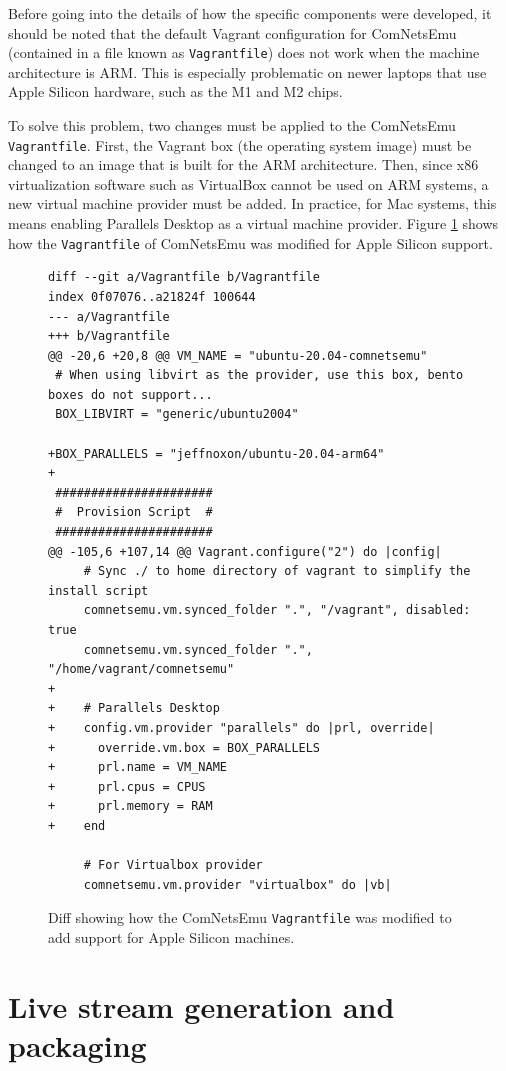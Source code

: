 Before going into the details of how the specific components were developed, it should be noted that the default Vagrant configuration for ComNetsEmu (contained in a file known as \texttt{Vagrantfile}) does not work when the machine architecture is ARM. This is especially problematic on newer laptops that use Apple Silicon hardware, such as the M1 and M2 chips.

To solve this problem, two changes must be applied to the ComNetsEmu \texttt{Vagrantfile}. First, the Vagrant box (the operating system image) must be changed to an image that is built for the ARM architecture. Then, since x86 virtualization software such as VirtualBox cannot be used on ARM systems, a new virtual machine provider must be added. In practice, for Mac systems, this means enabling Parallels Desktop as a virtual machine provider. Figure \ref{fig:vagrantfile} shows how the \texttt{Vagrantfile} of ComNetsEmu was modified for Apple Silicon support.

\begin{figure}
    \centering
    \begin{verbatim}
diff --git a/Vagrantfile b/Vagrantfile
index 0f07076..a21824f 100644
--- a/Vagrantfile
+++ b/Vagrantfile
@@ -20,6 +20,8 @@ VM_NAME = "ubuntu-20.04-comnetsemu"
 # When using libvirt as the provider, use this box, bento boxes do not support...
 BOX_LIBVIRT = "generic/ubuntu2004"

+BOX_PARALLELS = "jeffnoxon/ubuntu-20.04-arm64"
+
 ######################
 #  Provision Script  #
 ######################
@@ -105,6 +107,14 @@ Vagrant.configure("2") do |config|
     # Sync ./ to home directory of vagrant to simplify the install script
     comnetsemu.vm.synced_folder ".", "/vagrant", disabled: true
     comnetsemu.vm.synced_folder ".", "/home/vagrant/comnetsemu"
+
+    # Parallels Desktop
+    config.vm.provider "parallels" do |prl, override|
+      override.vm.box = BOX_PARALLELS
+      prl.name = VM_NAME
+      prl.cpus = CPUS
+      prl.memory = RAM
+    end

     # For Virtualbox provider
     comnetsemu.vm.provider "virtualbox" do |vb|
    \end{verbatim}
    \caption{Diff showing how the ComNetsEmu \texttt{Vagrantfile} was modified to add support for Apple Silicon machines.}
    \label{fig:vagrantfile}
\end{figure}


\section{Live stream generation and packaging}
\label{sec:testbed/packaging}

